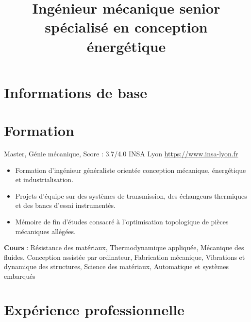 \documentclass[a4paper, serif, 10pt]{moderncv}
\title{Ingénieur mécanique senior spécialisé en conception énergétique}
\begin{document}
\maketitle

\section{Informations de base}

\section{Formation}

        {Master, Génie mécanique, Score : 3.7/4.0}
        {INSA Lyon}
        {\url{https://www.insa-lyon.fr}}
        {}
        {\begin{itemize}
\item Formation d'ingénieur généraliste orientée conception mécanique, énergétique et industrialisation.
\item Projets d'équipe sur des systèmes de transmission, des échangeurs thermiques et des bancs d'essai instrumentés.
\item Mémoire de fin d'études consacré à l'optimisation topologique de pièces mécaniques allégées.
\end{itemize}
\textbf{Cours} : Résistance des matériaux, Thermodynamique appliquée, Mécanique des fluides, Conception assistée par ordinateur, Fabrication mécanique, Vibrations et dynamique des structures, Science des matériaux, Automatique et systèmes embarqués}
\section{Expérience professionnelle}
\end{document}
